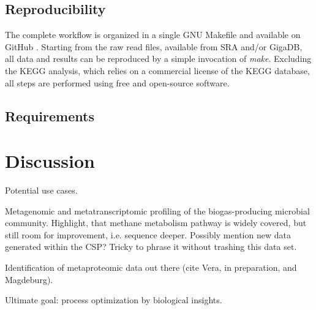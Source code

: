 \documentclass{bmcart}
\begin{document}
\subsection*{Reproducibility}
The complete workflow is organized in a single GNU Makefile and available on GitHub \cite{GitHub}.
Starting from the raw read files, available from SRA and/or GigaDB, all data and results can be reproduced by a simple invocation of \emph{make}.
Excluding the KEGG analysis, which relies on a commercial license of the KEGG database, all steps are performed using free and open-source software.

\subsection*{Requirements}
{}

\section*{Discussion}
Potential use cases.

Metagenomic and metatranscriptomic profiling of the biogas-producing microbial community.
Highlight, that methane metabolism pathway is widely covered, but still room for improvement, i.e. sequence deeper.
Possibly mention new data generated within the CSP? Tricky to phrase it without trashing this data set.

Identification of metaproteomic data out there (cite Vera, in preparation, and Magdeburg).

Ultimate goal: process optimization by biological insights.

\end{document}
